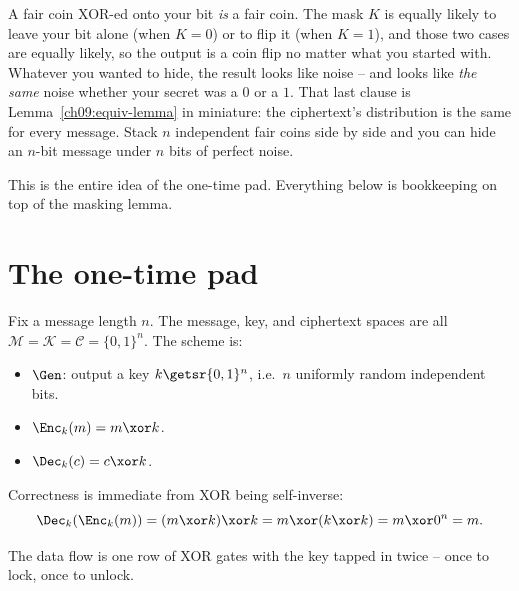 \begin{intuitionbox}
A fair coin XOR-ed onto your bit \emph{is} a fair coin. The mask $K$ is equally likely to leave your bit alone (when $K=0$) or to flip it (when $K=1$), and those two cases are equally likely, so the output is a coin flip no matter what you started with. Whatever you wanted to hide, the result looks like noise -- and looks like \emph{the same} noise whether your secret was a $0$ or a $1$. That last clause is Lemma~\ref{ch09:equiv-lemma} in miniature: the ciphertext's distribution is the same for every message. Stack $n$ independent fair coins side by side and you can hide an $n$-bit message under $n$ bits of perfect noise.
\end{intuitionbox}

This is the entire idea of the one-time pad. Everything below is bookkeeping on top of the masking lemma.

\section{The one-time pad}
\label{ch09:otp}

\begin{definition}
\label{ch09:otp-def}
Fix a message length $n$. The message, key, and ciphertext spaces are all $\mathcal{M} = \mathcal{K} = \mathcal{C} = \{0,1\}^n$. The scheme is:
\begin{itemize}
  \item $\Gen$: output a key $k \getsr \{0,1\}^n$, i.e.\ $n$ uniformly random independent bits.
  \item $\Enc_k(m) = m \xor k$.
  \item $\Dec_k(c) = c \xor k$.
\end{itemize}
\end{definition}

Correctness is immediate from XOR being self-inverse:
\[
  \Dec_k(\Enc_k(m)) = (m \xor k) \xor k = m \xor (k \xor k) = m \xor 0^n = m.
\]

The data flow is one row of XOR gates with the key tapped in twice -- once to lock, once to unlock.


